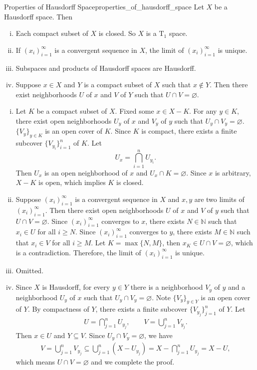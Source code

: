 \documentclass{report}
\begin{document}
\begin{proposition}{Properties of Hausdorff Space}{properties_of_hausdorff_space}
	Let $X$ be a Hausdorff space. Then
	\begin{enumerate}[(i)]
		\item Each compact subset of $X$ is closed. So $X$ is a $\mathrm{T}_1$ space.
		\item If $(x_i)_{i=1}^{\infty}$ is a convergent sequence in $X$, the limit of $(x_i)_{i=1}^{\infty}$ is unique.
		\item Subspaces and products of Hausdorff spaces are Hausdorff.
		\item Suppose $x\in X$ and $Y$ is a compact subset of $X$ such that $x\notin Y$. Then there exist neighborhoods $U$ of $x$ and $V$ of $Y$ such that $U\cap V=\varnothing$.
	\end{enumerate}
\end{proposition}
\begin{prf}
	\begin{enumerate}[(i)]
		\item Let $K$ be a compact subset of $X$. Fixed some $x\in X-K$. For any $y\in K$, there exist open neighborhoods $U_y$ of $x$ and $V_y$ of $y$ such that $U_y\cap V_y=\varnothing$. $\{ V_y\}_{y\in K}$ is an open cover of $K$. Since $K$ is compact, there exists a finite subcover $\{V_{y_i}\}_{i=1}^n$ of $K$. Let 
		$$
		U_x=\bigcap_{i=1}^n U_{y_i}.
		$$
		Then $U_x$ is an open neighborhood of $x$ and $U_x\cap K=\varnothing$. Since $x$ is arbitrary, $X-K$ is open, which implies $K$ is closed. 
		\item Suppose $(x_i)_{i=1}^{\infty}$ is a convergent sequence in $X$ and $x,y$ are two limits of $(x_i)_{i=1}^{\infty}$. Then there exist open neighborhoods $U$ of $x$ and $V$ of $y$ such that $U\cap V=\varnothing$. Since $(x_i)_{i=1}^{\infty}$ converges to $x$, there exists $N\in\mathbb{N}$ such that $x_i\in U$ for all $i\ge N$. Since $(x_i)_{i=1}^{\infty}$ converges to $y$, there exists $M\in\mathbb{N}$ such that $x_i\in V$ for all $i\ge M$. Let $K=\max\{N,M\}$, then $x_K\in U\cap V=\varnothing$, which is a contradiction. Therefore, the limit of $(x_i)_{i=1}^{\infty}$ is unique.
		\item Omitted.
		\item Since $X$ is Hausdorff, for every $y\in Y$ there is a neighborhood $V_y$ of $y$ and a neighborhood $U_y$ of $x$ such that $U_y\cap V_y=\varnothing$. Note $\{V_y\}_{y\in Y}$ is an open cover of $Y$. By compactness of $Y$, there exists a finite subcover $\{V_{y_j}\}_{j=1}^n$ of $Y$. Let
		\begin{align*}
			U= \bigcap_{j=1}^n U_{y_j}, \qquad V= \bigcup_{j=1}^n V_{y_j}.
		\end{align*} 
		Then $x\in U$ and $Y\subseteq V$. Since $U_y\cap V_y=\varnothing$, we have
		\begin{align*}
			V= \bigcup_{j=1}^n V_{y_j} \subseteq \bigcup_{j=1}^n\left(X- U_{y_j}\right) = X- \bigcap_{j=1}^n U_{y_j} = X-U,
		\end{align*}
		which means $U\cap V =\varnothing$ and we complete the proof.
		
	\end{enumerate}
\end{prf}
\end{document}
